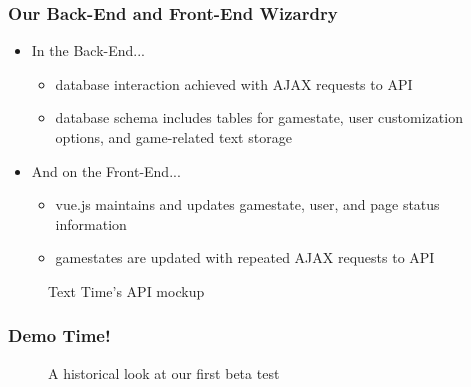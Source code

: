 \documentclass[t]{beamer}
\begin{document}
    \begin{frame}
        \frametitle{Our Back-End and Front-End Wizardry}
        \begin{itemize}
          \item In the Back-End...
          \begin{itemize}
              \item database interaction achieved with AJAX requests to API
              \item database schema includes tables for gamestate, user customization options, and game-related text storage
          \end{itemize}
          \item And on the Front-End...
          \begin{itemize}
            \item vue.js maintains and updates gamestate, user, and page status information
            \item gamestates are updated with repeated AJAX requests to API
          \end{itemize}
        \end{itemize}
        \begin{figure}
            \begin{center}
            \end{center}
            \caption{Text Time's API mockup}
        \end{figure}
    \end{frame}

    \begin{frame}
        \frametitle{Demo Time!}
        \begin{figure}
            \begin{center}
            \end{center}
            \caption{A historical look at our first beta test}
        \end{figure}
    \end{frame}
\end{document}
